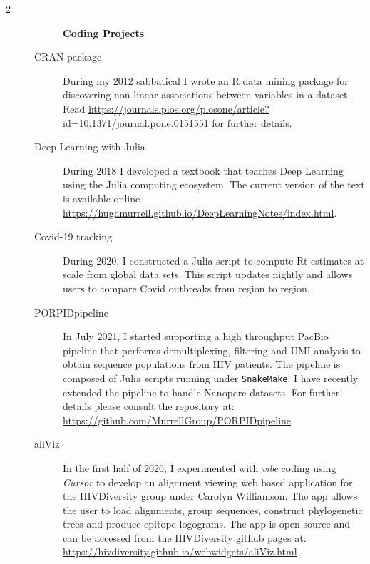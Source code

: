 \documentclass[12pt]{article}
\begin{document}
\begin{multicols}{2}
\begin{description}\item[] \begin{description}\item[] {\large \bf  Coding Projects }
\item[CRAN package ]
	During my 2012 sabbatical I wrote an R data mining package for discovering
	non-linear associations between variables in a dataset. Read 
	\url{https://journals.plos.org/plosone/article?id=10.1371/journal.pone.0151551}       
	for further details.
\item[Deep Learning with Julia]
        During 2018 I developed a textbook 
        that teaches Deep Learning using the Julia computing ecosystem. 
        The current version of the text is available online \url{https://hughmurrell.github.io/DeepLearningNotes/index.html}.
\item[Covid-19 tracking ]
	During 2020, I constructed a Julia script
	to compute Rt estimates at scale from global data sets. This script updates
	nightly and allows users to compare Covid outbreaks from region to region.
 \item[ PORPIDpipeline   ]  In July 2021, I started supporting a high throughput 
 	PacBio pipeline that performs demultiplexing, filtering and UMI analysis 
	to obtain sequence populations from HIV patients. The pipeline is composed 
	of Julia scripts running under {\tt SnakeMake}. I have recently extended
	the pipeline to handle Nanopore datasets.
 	For further details please consult the
	repository at: \url{https://github.com/MurrellGroup/PORPIDpipeline}
 \item[ aliViz  ]  In the first half of 2026, I experimented with {\it vibe} coding using {\it Cursor} 
 	to develop an alignment viewing web based application for the HIVDiversity group under 
	Carolyn Williamson. The app allows the user to load alignments, group sequences, 
	construct phylogenetic trees and produce epitope logograms.
 	The app is open source and can be accessed from the HIVDiversity github pages 
	at: \url{https://hivdiversity.github.io/webwidgets/aliViz.html}
 
 \end{description}
\end{description}



\end{multicols}
\end{document}
